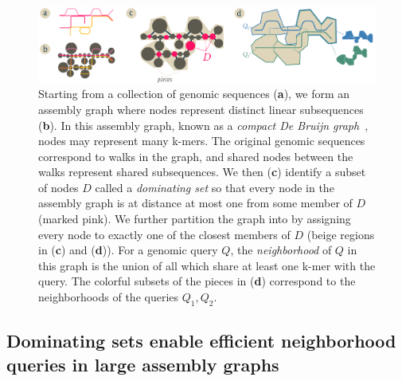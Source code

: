 %
%

\begin{figure}
 \centering
 \includegraphics[width=\linewidth]{figures/domset}
	\caption{
 Starting from a collection of genomic sequences (\textbf a), we form an assembly graph
 where nodes represent distinct linear subsequences (\textbf b). In this assembly graph,
 known as a \emph{compact De Bruijn graph}~\cite{lin2016accurate}, nodes may
 represent many k-mers. The original genomic sequences correspond to walks in
 the graph, and shared nodes between the walks represent shared subsequences.
 We then (\textbf c) identify a subset of nodes $D$ called a \emph{dominating set} so that
 every node in the assembly graph is at distance at most one from some member of
 $D$ (marked pink). We further partition the graph into \emph{\pieces}
 by assigning every node to exactly one of the closest members of $D$ (beige regions
 in (\textbf c) and (\textbf d)).
 For a genomic query $Q$, the \emph{neighborhood} of $Q$ in this graph is the
 union of all \pieces which share at least one k-mer with the query. The colorful
 subsets of the pieces in (\textbf d) correspond to the neighborhoods of the
 queries $Q_1, Q_2$.
 }
 \label{fig:domset}
\end{figure}

\subsection*{Dominating sets enable efficient neighborhood queries in large assembly graphs}

